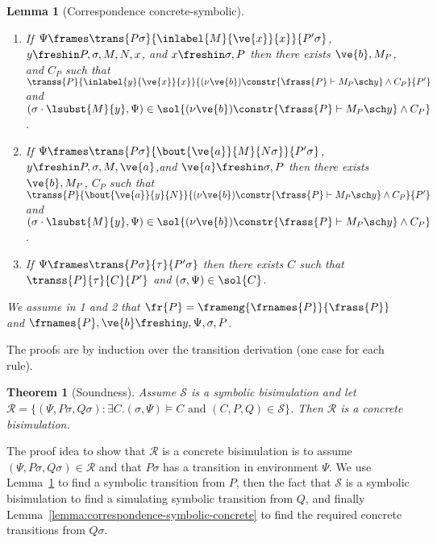 \documentclass{eptcs}
\newtheorem{lemma}[definition]{Lemma}
\newtheorem{theorem}[definition]{Theorem}
\theoremstyle{definition}
\begin{document}
\begin{lemma}[Correspondence concrete-symbolic]\mbox{}\\
\label{lemma:correspondence-concrete-symbolic}
\vspace{-1\baselineskip}
\begin{enumerate}
 \item   If $\Psi \frames
\trans{P\sigma}{\inlabel{M}{\ve{x}}{x}}{P'\sigma}$,\quad $y \freshin
P,\sigma,M,N,x$,\quad
and $x \freshin \sigma, P$
then there exists $\ve{b}, M_P$, and $C_P$  such that
\\$\transs{P}{\inlabel{y}{\ve{x}}{x}}{(\nu
\ve{b})\constr{\frass{P} \vdash M_P \sch y}\wedge C_P}{P'}$
and $(\sigma\cdot\lsubst{M}{y},\Psi) \in \sol{(\nu
\ve{b})\constr{\frass{P}
\vdash M_P \sch
y} \wedge C_P}$.
\item   If $\Psi \frames
\trans{P\sigma}{\bout{\ve{a}}{M}{N\sigma}}{P'\sigma}$,\quad $y \freshin
P,\sigma,M,\ve{a}$,\quad and $\ve{a} \freshin \sigma, P$
then there exists $\ve{b}, M_P$, $C_P$ such that
\\$\transs{P}{\bout{\ve{a}}{y}{N}}{(\nu
\ve{b})\constr{\frass{P} \vdash M_P \sch y} \wedge C_P}{P'}$
 and
$(\sigma\cdot\lsubst{M}{y},\Psi) \in \sol{(\nu
\ve{b})\constr{\frass{P}
\vdash M_P \sch y} \wedge C_P}$.
\item   If $\Psi \frames \trans{P\sigma}{\tau}{P'\sigma}$
then there exists $C$ such that $\transs{P}{\tau}{C}{P'}$
 and $(\sigma,\Psi) \in \sol{C}$.
\end{enumerate}
We assume in 1 and 2 that $\fr{P} = \frameng{\frnames{P}}{\frass{P}}$ and
$\frnames{P},\ve{b} \freshin y,\Psi,\sigma,P$.
\end{lemma}

The proofs are by induction over the transition derivation (one case for each
rule).


\begin{theorem}[Soundness]
\label{theorem:soundness}
Assume $\mathcal{S}$ is a symbolic bisimulation and let \\ $\mathcal{R} = \{(\Psi,
P\sigma, Q\sigma) : \exists C . (\sigma,\Psi)
\models C \text{ and } (C,P,Q) \in \mathcal{S}\}$.
Then $\mathcal{R}$ is a concrete bisimulation.
\end{theorem}

The proof idea to show that $\mathcal{R}$ is a concrete bisimulation is to
assume $(\Psi, P\sigma, Q\sigma) \in \mathcal{R}$ and that $P\sigma$ has a
transition in environment $\Psi$. We use
Lemma~\ref{lemma:correspondence-concrete-symbolic} to find a symbolic transition
from $P$, then the fact that $\mathcal{S}$ is a symbolic bisimulation to find a
simulating symbolic transition from $Q$, and finally
Lemma~\ref{lemma:correspondence-symbolic-concrete} to find the required concrete
transitions from $Q\sigma$. 
\end{document}
